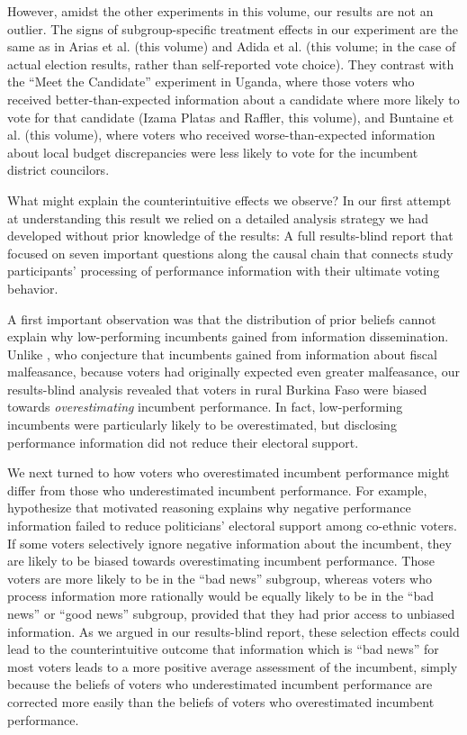 \documentclass[11pt]{article}
\begin{document}
However, amidst the other experiments in this volume, our results are not an outlier. The signs of subgroup-specific treatment effects in our experiment are the same as in Arias et al. (this volume) and Adida et al. (this volume; in the case of actual election results, rather than self-reported vote choice). They contrast with the ``Meet the Candidate'' experiment in Uganda, where those voters who received better-than-expected information about a candidate where more likely to vote for that candidate (Izama Platas and Raffler, this volume), and Buntaine et al. (this volume), where voters who received worse-than-expected information about local budget discrepancies were less likely to vote for the incumbent district councilors. 

What might explain the counterintuitive effects we observe? In our first attempt at understanding this result we relied on a detailed analysis strategy we had developed without prior knowledge of the results: A full results-blind report that focused on seven important questions along the causal chain that connects study participants' processing of performance information with their ultimate voting behavior. 

A first important observation was that the distribution of prior beliefs cannot explain why low-performing incumbents gained from information dissemination. Unlike \citep{Arias2017}, who conjecture that incumbents gained from information about fiscal malfeasance, because voters had originally expected even greater malfeasance, our results-blind analysis revealed that voters in rural Burkina Faso were biased towards \emph{overestimating} incumbent performance. In fact, low-performing incumbents were particularly likely to be overestimated, but disclosing performance information did not reduce their electoral support. 

We next turned to how voters who overestimated incumbent performance might differ from those who underestimated incumbent performance. For example, \citep{Adida2017} hypothesize that motivated reasoning explains why negative performance information failed to reduce politicians' electoral support among co-ethnic voters. If some voters selectively ignore negative information about the incumbent, they are likely to be biased towards overestimating incumbent performance. Those voters are more likely to be in the ``bad news'' subgroup, whereas voters who process information more rationally would be equally likely to be in the ``bad news'' or ``good news'' subgroup, provided that they had prior access to unbiased information. As we argued in our results-blind report, these selection effects could lead to the counterintuitive outcome that information which is ``bad news'' for most voters leads to a more positive average assessment of the incumbent, simply because the beliefs of voters who underestimated incumbent performance are corrected more easily than the beliefs of voters who overestimated incumbent performance. 
\end{document}
